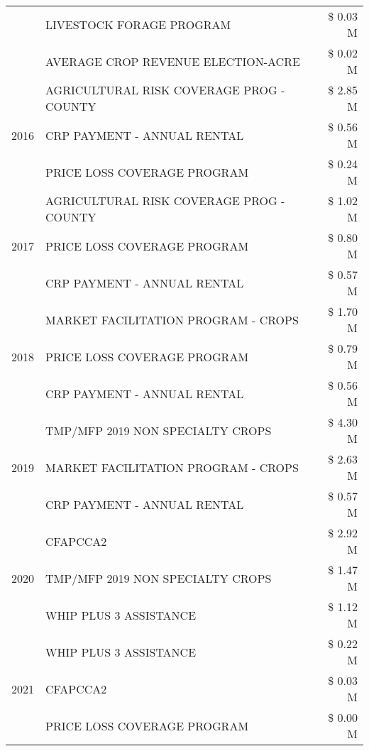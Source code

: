 \begin{tabular}{llr}
 & LIVESTOCK FORAGE PROGRAM & \$ 0.03 M \\
 & AVERAGE CROP REVENUE ELECTION-ACRE & \$ 0.02 M \\
\cline{1-3}
\multirow[t]{3}{*}{2016} & AGRICULTURAL RISK COVERAGE PROG - COUNTY & \$ 2.85 M \\
 & CRP PAYMENT - ANNUAL RENTAL & \$ 0.56 M \\
 & PRICE LOSS COVERAGE PROGRAM & \$ 0.24 M \\
\cline{1-3}
\multirow[t]{3}{*}{2017} & AGRICULTURAL RISK COVERAGE PROG - COUNTY & \$ 1.02 M \\
 & PRICE LOSS COVERAGE PROGRAM & \$ 0.80 M \\
 & CRP PAYMENT - ANNUAL RENTAL & \$ 0.57 M \\
\cline{1-3}
\multirow[t]{3}{*}{2018} & MARKET FACILITATION PROGRAM - CROPS & \$ 1.70 M \\
 & PRICE LOSS COVERAGE PROGRAM & \$ 0.79 M \\
 & CRP PAYMENT - ANNUAL RENTAL & \$ 0.56 M \\
\cline{1-3}
\multirow[t]{3}{*}{2019} & TMP/MFP 2019 NON SPECIALTY CROPS & \$ 4.30 M \\
 & MARKET FACILITATION PROGRAM - CROPS & \$ 2.63 M \\
 & CRP PAYMENT - ANNUAL RENTAL & \$ 0.57 M \\
\cline{1-3}
\multirow[t]{3}{*}{2020} & CFAPCCA2 & \$ 2.92 M \\
 & TMP/MFP 2019 NON SPECIALTY CROPS & \$ 1.47 M \\
 & WHIP PLUS 3 ASSISTANCE & \$ 1.12 M \\
\cline{1-3}
\multirow[t]{3}{*}{2021} & WHIP PLUS 3 ASSISTANCE & \$ 0.22 M \\
 & CFAPCCA2 & \$ 0.03 M \\
 & PRICE LOSS COVERAGE PROGRAM & \$ 0.00 M \\
\cline{1-3}
\bottomrule
\end{tabular}
